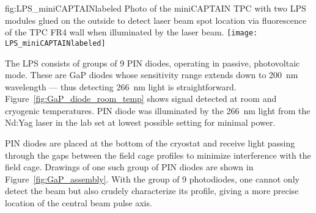 \begin{dunefigure}{fig:LPS_miniCAPTAINlabeled}
{Photo of the miniCAPTAIN TPC with two LPS modules glued on the outside to detect laser beam spot location via fluorescence of the TPC FR4 wall when illuminated by the laser beam.}
\texttt{[image: LPS\_miniCAPTAINlabeled]} 
\end{dunefigure}

The LPS consists of groups of \num{9} PIN diodes, operating in passive, photovoltaic mode. These are GaP diodes whose sensitivity range extends down to  \SI{200}{\nano\m} wavelength --- thus detecting \SI{266}{\nano\m} light is straightforward. Figure~\ref{fig:GaP_diode_room_temp} shows signal detected at room and cryogenic temperatures. PIN diode was illuminated by the \SI{266}{\nano\m} light from the Nd:Yag
laser in the lab 
set at lowest possible setting for minimal power.  

PIN diodes are placed at the bottom of the cryostat and receive light passing through the gaps between the field cage profiles to minimize interference with the field cage. Drawings of one such group of PIN diodes are shown in Figure~\ref{fig:GaP_assembly}. With the group of \num{9} photodiodes, one cannot only detect the beam but also crudely characterize its profile, giving a more precise location of the central beam pulse axis.




